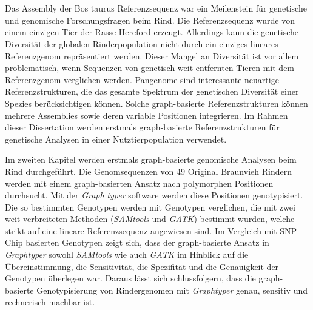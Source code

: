 \documentclass[11 pt, a4paper, notitlepage, twoside]{report}
\begin{document}
\newpage

\thispagestyle{plain}
{}
\section*{}

Das Assembly der Bos taurus Referenzsequenz war ein Meilenstein für genetische und genomische Forschungsfragen beim Rind. Die Referenzsequenz wurde von einem einzigen Tier der Rasse Hereford erzeugt. Allerdings kann die genetische Diversität der globalen Rinderpopulation nicht durch ein einziges lineares Referenzgenom repräsentiert werden. Dieser Mangel an Diversität ist vor allem problematisch, wenn Sequenzen von genetisch weit entfernten Tieren mit dem Referenzgenom verglichen werden. Pangenome sind interessante neuartige Referenzstrukturen, die das gesamte Spektrum der genetischen Diversität einer Spezies berücksichtigen können. Solche graph-basierte Referenzstrukturen können mehrere Assemblies sowie deren variable Positionen integrieren. Im Rahmen dieser Dissertation werden erstmals graph-basierte Referenzstrukturen für genetische Analysen in einer Nutztierpopulation verwendet.

Im zweiten Kapitel werden erstmals graph-basierte genomische Analysen beim Rind durchgeführt. Die Genomsequenzen von 49 Original Braunvieh Rindern werden mit einem graph-basierten Ansatz nach polymorphen Positionen durchsucht. Mit der \emph{Graph} \emph{typer} software werden diese Positionen genotypisiert. Die so bestimmten Genotypen werden mit Genotypen verglichen, die mit zwei weit verbreiteten Methoden (\emph{SAMtools} und \emph{GATK}) bestimmt wurden, welche strikt auf eine lineare Referenzsequenz angewiesen sind. Im Vergleich mit SNP-Chip basierten Genotypen zeigt sich, dass der graph-basierte Ansatz in \emph{Graphtyper} sowohl \emph{SAMtools} wie auch \emph{GATK} im Hinblick auf die Übereinstimmung, die Sensitivität, die Spezifität und die Genauigkeit der Genotypen überlegen war. Daraus lässt sich schlussfolgern, dass die graph-basierte Genotypisierung von Rindergenomen mit \emph{Graphtyper} genau, sensitiv und rechnerisch machbar ist.
\end{document}
